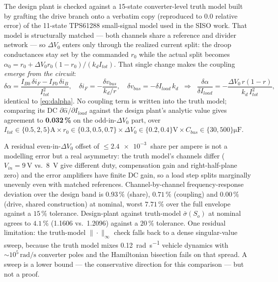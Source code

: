 \documentclass[energies,article,submit,pdftex,oneauthor]{Definitions/mdpi}
\begin{document}
The design plant is checked against a 15-state converter-level truth model built by grafting the
drive branch onto a verbatim copy (reproduced to $0.0$ relative error) of the 11-state TPS61288
small-signal model used in the SISO work. That model is structurally matched --- both channels
share a reference and divider network --- so $\Delta V_0$ enters only through the realized
current split: the droop conductances stay set by the commanded $r_0$ while the actual split
becomes $\alpha_0 = r_0 + \Delta V_0 r_0(1-r_0)/(k_d I_{tot})$. That single change makes the
coupling \emph{emerge from the circuit}:
\begin{equation}\label{eq:emergent}
\delta\alpha = \frac{I_{B0}\,\delta i_F - I_{F0}\,\delta i_B}{I_{tot}^2},\quad
\delta i_F = -\frac{\delta v_{bus}}{k_d/r},\quad
\delta v_{bus} = -\delta I_{load}\,k_d
\;\;\Longrightarrow\;\;
\frac{\delta\alpha}{\delta I_{load}} = -\frac{\Delta V_0\, r(1-r)}{k_d\, I_{tot}^2},
\end{equation}
identical to \eqref{eq:dalpha}. No coupling term is written into the truth model; comparing its
DC $\partial\hat\alpha/\partial I_{load}$ against the design plant's analytic value gives
agreement to \textbf{0.032\,\%} on the odd-in-$\Delta V_0$ part, over
$I_{tot}\in\{0.5,2,5\}\si{\ampere}\times r_0\in\{0.3,0.5,0.7\}\times
\Delta V_0\in\{0.2,0.4\}\si{\volt}\times C_{bus}\in\{30,500\}\si{\micro\farad}$.

A residual even-in-$\Delta V_0$ offset of $\le\SI{2.4e-3}{}$ share per ampere is not a modelling
error but a real asymmetry: the truth model's channels differ ($V_{in} = \SI{9}{\volt}$ vs.\
\SI{8}{\volt} give different duty, compensation gain and right-half-plane zero) and the error
amplifiers have finite DC gain, so a load step splits marginally unevenly even with matched
references. Channel-by-channel frequency-response deviation over the design band is $0.93\,\%$
(share), $0.71\,\%$ (coupling) and $0.00\,\%$ (drive, shared construction) at nominal, worst
$7.71\,\%$ over the full envelope against a $15\,\%$ tolerance. Design-plant against truth-model
$\bar\sigma(S_o)$ at nominal agrees to $4.1\,\%$ (1.1606 vs.\ 1.2096) against a $20\,\%$
tolerance. One residual limitation: the truth-model $\|\cdot\|_\infty$ check falls back to a
dense singular-value sweep, because the truth model mixes \SI{0.12}{\radian\per\second} vehicle
dynamics with $\sim10^{5}\,\si{\radian\per\second}$ converter poles and the Hamiltonian bisection
fails on that spread. A sweep is a lower bound --- the conservative direction for this
comparison --- but not a proof.
\end{document}
